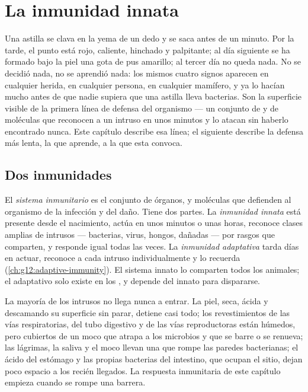 \chapter{La inmunidad innata}\label{ch:g12:innate-immunity}

Una astilla se clava en la yema de un dedo y se saca antes de un
minuto. Por la tarde, el punto está rojo, caliente, hinchado y
palpitante; al día siguiente se ha formado bajo la piel una gota de pus
amarillo; al tercer día no queda nada. No se decidió nada, no se
aprendió nada: los mismos cuatro signos aparecen en cualquier herida,
en cualquier persona, en cualquier mamífero, y ya lo hacían mucho antes
de que nadie supiera que una astilla lleva bacterias. Son la superficie
visible de la primera línea de defensa del organismo --- un conjunto de
 y de moléculas que reconocen a un intruso en unos minutos y lo
atacan sin haberlo encontrado nunca. Este capítulo describe esa línea;
el siguiente describe la defensa más lenta, la que aprende, a la que
esta convoca.

\section{Dos inmunidades}

\begin{definition}\label{def:g12:innate-immunity:immunity}
El \emph{sistema inmunitario} es el
conjunto de órganos,  y moléculas que defienden al organismo de
la infección y del daño. Tiene dos partes. La \emph{inmunidad
innata} está presente desde el nacimiento,
actúa en unos minutos o unas horas, reconoce clases amplias de
intrusos --- bacterias, virus, hongos,  dañadas --- por rasgos
que comparten, y responde igual todas las veces. La \emph{inmunidad
adaptativa} tarda días en actuar, reconoce
a cada intruso individualmente y lo recuerda
(\cref{ch:g12:adaptive-immunity}). El sistema innato lo comparten todos
los animales; el adaptativo solo existe en los , y depende
del innato para dispararse.
\end{definition}

\begin{proposition}\label{prop:g12:innate-immunity:barriers}
La mayoría de los intrusos no llega nunca a entrar. La piel, seca,
ácida y descamando su superficie sin parar, detiene casi todo; los
revestimientos de las vías respiratorias, del tubo digestivo y de las
vías reproductoras están húmedos, pero cubiertos de un moco que atrapa
a los microbios y que se barre o se renueva; las lágrimas, la saliva y
el moco llevan una  que rompe las paredes bacterianas; el ácido
del estómago y las propias bacterias del intestino, que ocupan el
sitio, dejan poco espacio a los recién llegados. La respuesta
inmunitaria de este capítulo empieza cuando se rompe una barrera.
\end{proposition}
\admitted

